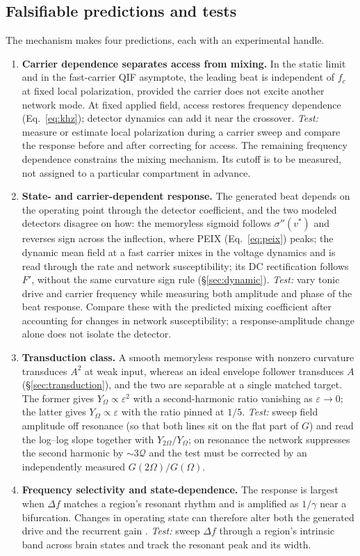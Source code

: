 \documentclass[11pt,a4paper]{article}
\newcommand{\Sig}{\sigma}
\begin{document}
\subsection{Falsifiable predictions and tests}\label{sec:predictions}
The mechanism makes four predictions, each with an experimental handle.
\begin{enumerate}[leftmargin=*]
\item \textbf{Carrier dependence separates access from mixing.} In the static limit
and in the fast-carrier QIF asymptote, the leading beat is independent of $f_c$ at
fixed local polarization, provided the carrier does not excite another network mode.
At fixed applied field, access restores frequency dependence
(Eq.~\eqref{eq:khz}); detector dynamics can add it near the crossover.
\emph{Test:} measure or estimate local polarization during a carrier sweep and
compare the response before and after correcting for access. The remaining
frequency dependence constrains the mixing mechanism. Its cutoff is to be
measured, not assigned to a particular compartment in advance.
\item \textbf{State- and carrier-dependent response.} The generated beat depends on
the operating point through the detector coefficient, and the two modeled detectors
disagree on how: the memoryless sigmoid follows $\Sig''(v^*)$ and reverses sign across the
inflection, where PEIX (Eq.~\eqref{eq:peix}) peaks; the dynamic mean field at a fast
carrier mixes in the voltage dynamics and is read through the rate and network
susceptibility; its DC rectification follows $F'$, without the same curvature sign rule
(\S\ref{sec:dynamic}). \emph{Test:} vary tonic drive and carrier frequency while
measuring both amplitude and phase of the beat response. Compare these with the
predicted mixing coefficient after accounting for changes in network susceptibility;
a response-amplitude change alone does not isolate the detector.
\item \textbf{Transduction class.} A smooth memoryless response with nonzero curvature
transduces $A^2$ at weak input, whereas an ideal envelope follower transduces $A$
(\S\ref{sec:transduction}), and the two are separable at a
single matched target. The former gives $Y_\Omega\propto\varepsilon^2$ with a second-harmonic
ratio vanishing as $\varepsilon\!\to\!0$; the latter gives $Y_\Omega\propto\varepsilon$ with
the ratio pinned at $1/5$. \emph{Test:} sweep field amplitude off resonance (so that both
lines sit on the flat part of $G$) and read the log--log slope together with
$Y_{2\Omega}/Y_\Omega$; on resonance the network suppresses the second harmonic by
$\sim3\mathcal{Q}$ and the test must be corrected by an independently measured
$G(2\Omega)/G(\Omega)$.

\item \textbf{Frequency selectivity and state-dependence.} The response is largest
when $\Delta f$ matches a region's resonant rhythm and is amplified as $1/\gamma$ near
a bifurcation. Changes in operating state can therefore alter both the generated
drive and the recurrent gain \cite{ruffini2025cfc}. \emph{Test:}
sweep $\Delta f$ through a region's intrinsic band across brain states and track the
resonant peak and its width.
\end{enumerate}
\end{document}
